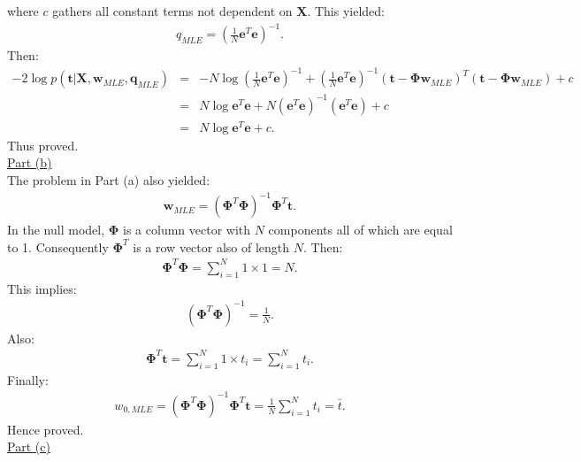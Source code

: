 \documentclass[a4paper, 11pt]{article}
\begin{document}
where $c$ gathers all constant terms not dependent on $\mathbf{X}$. This yielded:
\begin{eqnarray}
q_{MLE} = \left( \frac{1}{N} \mathbf{e}^T \mathbf{e} \right)^{-1}. \nonumber
\end{eqnarray}
Then:
\begin{eqnarray}
-2 \log p(\mathbf{t} | \mathbf{X}, \mathbf{w}_{MLE}, \mathbf{q}_{MLE}) &=& -N \log \left( \frac{1}{N} \mathbf{e}^T \mathbf{e} \right)^{-1} + \left( \frac{1}{N} \mathbf{e}^T \mathbf{e} \right)^{-1} (\mathbf{t} - \mathbf{\Phi} \mathbf{w}_{MLE})^T (\mathbf{t} - \mathbf{\Phi} \mathbf{w}_{MLE}) + c \nonumber \\
&=& N \log \mathbf{e}^T \mathbf{e} + N \left( \mathbf{e}^T \mathbf{e} \right)^{-1} \left( \mathbf{e}^T \mathbf{e} \right) + c \nonumber \\
&=& N \log \mathbf{e}^T \mathbf{e} + c. \nonumber
\end{eqnarray}
Thus proved.\\
\newline \underline{Part (b)}\\
\newline The problem in Part (a) also yielded:
\begin{eqnarray}
\mathbf{w}_{MLE} = \left( \mathbf{\Phi}^T \mathbf{\Phi} \right)^{-1} \mathbf{\Phi}^T \mathbf{t}. \nonumber
\end{eqnarray}
In the null model, $\mathbf{\Phi}$ is a column vector with $N$ components all of which are equal to 1. Consequently $\mathbf{\Phi}^T$ is a row vector also of length $N$. Then:
\begin{eqnarray}
\mathbf{\Phi}^T \mathbf{\Phi} = \sum_{i=1}^{N} 1 \times 1 = N. \nonumber
\end{eqnarray}
This implies:
\begin{eqnarray}
\left( \mathbf{\Phi}^T \mathbf{\Phi} \right)^{-1} = \frac{1}{N}. \nonumber
\end{eqnarray}
Also:
\begin{eqnarray}
\mathbf{\Phi}^T \mathbf{t} = \sum_{i=1}^{N} 1 \times t_i = \sum_{i=1}^{N} t_i. \nonumber
\end{eqnarray}
Finally:
\begin{eqnarray}
w_{0, MLE} = \left( \mathbf{\Phi}^T \mathbf{\Phi} \right)^{-1} \mathbf{\Phi}^T \mathbf{t} = \frac{1}{N} \sum_{i=1}^{N} t_i = \bar{t}. \nonumber
\end{eqnarray}
Hence proved.\\
\newline \underline{Part (c)}\\
\end{document}
